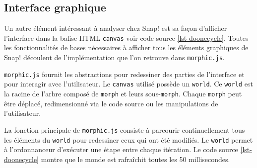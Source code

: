 % 
% 
% 

\subsection{Interface graphique}
Un autre élément intéressant à analyser chez Snap! est sa façon d'afficher l'interface dans la balise HTML \texttt{canvas} voir code source \ref{lst-doonecycle}. Toutes les fonctionnalités de bases nécessaires à afficher tous les éléments graphiques de Snap! découlent de l'implémentation que l'on retrouve dans \texttt{morphic.js}.

\texttt{morphic.js} fournit les abstractions pour redessiner des parties de l'interface et pour interagir avec l'utilisateur. Le \texttt{canvas} utilisé possède un \texttt{world}. Ce \texttt{world} est la racine de l'arbre composé de \texttt{morph} et leurs sous-\texttt{morph}. Chaque \texttt{morph} peut être déplacé, redimensionné via le code source ou les manipulations de l'utilisateur.

La fonction principale de \texttt{morphic.js} consiste à parcourir continuellement tous les éléments du \texttt{world} pour redessiner ceux qui ont été modifiés. Le \texttt{world} permet à l'ordonnanceur d'exécuter une étape entre chaque itération. Le code source \ref{lst-doonecycle} montre que le monde est rafraîchit toutes les 50 millisecondes.

